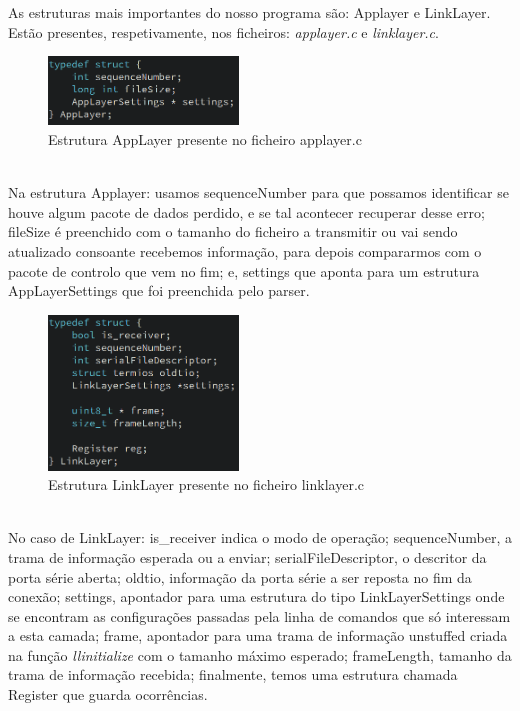 \documentclass[a4paper]{article}
\begin{document}
As estruturas mais importantes do nosso programa são: Applayer e LinkLayer.
Estão presentes, respetivamente, nos ficheiros: \textit{applayer.c} e
\textit{linklayer.c}.\\
\begin{figure}[h]
\centering
    \includegraphics[width=0.45\textwidth]{applayerStruct.png}
    \caption{Estrutura AppLayer presente no ficheiro applayer.c}
\end{figure} \\
Na estrutura Applayer: usamos sequenceNumber para que
possamos identificar se houve algum pacote de dados perdido, e se tal acontecer
recuperar desse erro; fileSize é preenchido com o tamanho do ficheiro a
transmitir ou vai sendo atualizado consoante recebemos informação, para
depois compararmos com o pacote de controlo que vem no fim; e, settings que
aponta para um estrutura AppLayerSettings que foi preenchida pelo parser.\\
\begin{figure}[h]
\centering
    \includegraphics[width=0.45\textwidth]{linklayerStruct.png}
    \caption{Estrutura LinkLayer presente no ficheiro linklayer.c}
\end{figure}
\\ No
caso de LinkLayer: is\_receiver indica o modo de operação; sequenceNumber, a
trama de informação esperada ou a enviar; serialFileDescriptor, o descritor da
porta série aberta; oldtio, informação da porta série a ser reposta no fim da
conexão; settings, apontador para uma estrutura do tipo LinkLayerSettings onde
se encontram as configurações passadas pela linha de comandos que só interessam
a esta camada; frame, apontador para uma trama de informação unstuffed criada
na função \textit{llinitialize} com o tamanho máximo esperado; frameLength, tamanho da
trama de informação recebida; finalmente, temos uma estrutura chamada Register
que guarda ocorrências.
\end{document}
